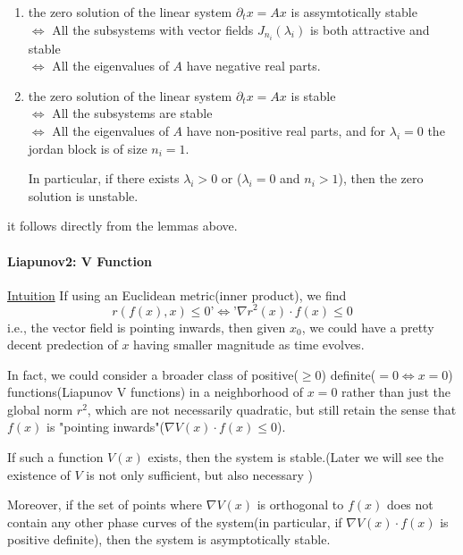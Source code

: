 \documentclass{tufte-handout}
\begin{document}
\begin{theorem} 
	\begin{enumerate}
		\item 
	the zero solution of the linear system $\partial_t x = Ax$ is assymtotically stable  \\ $\iff$ All the subsystems with vector fields $J_{n_i}(\lambda_i)$ is both attractive and stable \\ $\iff$ All the eigenvalues of $A$ have negative real parts.
\item
	the zero solution of the linear system $\partial_t x = Ax$ is stable \\ $\iff$ All the subsystems are stable \\ $\iff$ All the eigenvalues of $A$ have non-positive real parts, and for $\lambda_i=0$ the jordan block is of size $n_i=1$.

	In particular, if there exists $\lambda_i>0$ or ($\lambda_i=0$ and $n_i>1$), then the zero solution is unstable.
\end{enumerate}
\end{theorem}
\begin{formalproof} it follows directly from the lemmas above. \end{formalproof}

\paragraph{Liapunov2: V Function}
\underline{Intuition}
If using an Euclidean metric(inner product), we find \[ r(f(x),x)\leq 0  \text{'} \iff \text{'}  \nabla r^2(x) \cdot f(x) \leq 0 \]
i.e., the vector field is pointing inwards, then given $x_0$, we could have a pretty decent predection of $x$ having smaller magnitude as time evolves.


In fact, we could consider a broader class of positive($\geq0$) definite($=0 \iff x=0$) functions(Liapunov V functions) in a neighborhood of $x=0$ rather than just the global norm $r^2$, which are not necessarily quadratic, but still retain the sense that $f(x)$ is "pointing inwards"($\nabla V(x) \cdot f(x) \leq 0$).
\begin{theorem} 
	If such a function $V(x)$ exists, then the system is stable.(Later we will see the existence of $V$ is not only sufficient, but also necessary )

	Moreover, if the set of points where $\nabla V(x)$ is orthogonal to $f(x)$ does not contain any other phase curves of the system(in particular, if $\nabla V(x) \cdot f(x) $ is positive definite), then the system is asymptotically stable.

\end{theorem} 
\end{document}
